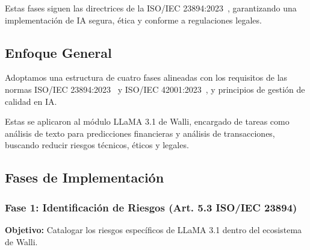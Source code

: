 \documentclass[12pt]{article}
\begin{document}
Estas fases siguen las directrices de la ISO/IEC 23894:2023~\cite{iso23894}, garantizando una implementación de IA segura, ética y conforme a regulaciones legales.

\subsection{Enfoque General}
Adoptamos una estructura de cuatro fases alineadas con los requisitos de las normas ISO/IEC 23894:2023~\cite{iso23894} y ISO/IEC 42001:2023~\cite{intedya}, y principios de gestión de calidad en IA. 

Estas se aplicaron al módulo LLaMA 3.1 de Walli, encargado de tareas como análisis de texto para predicciones financieras y análisis de transacciones, buscando reducir riesgos técnicos, éticos y legales.

\subsection{Fases de Implementación}

\subsubsection{Fase 1: Identificación de Riesgos (Art. 5.3 ISO/IEC 23894)}
\textbf{Objetivo:} Catalogar los riesgos específicos de LLaMA 3.1 dentro del ecosistema de Walli.
\end{document}
